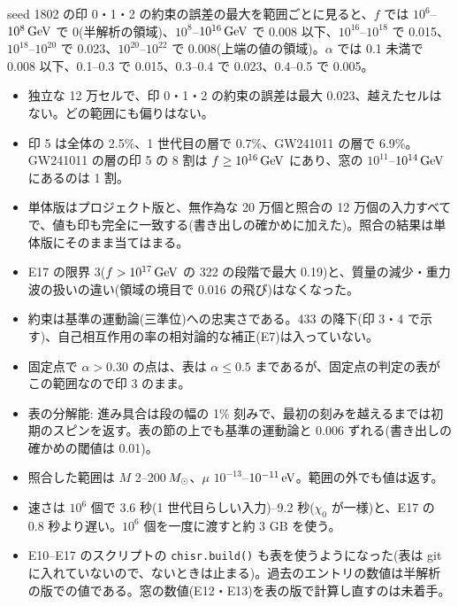 seed 1802 の印 0・1・2 の約束の誤差の最大を範囲ごとに見ると、$f$ では $10^6$--$10^8\,\mathrm{GeV}$ で 0(半解析の領域)、$10^8$--$10^{16}\,\mathrm{GeV}$ で 0.008 以下、$10^{16}$--$10^{18}$ で 0.015、$10^{18}$--$10^{20}$ で 0.023、$10^{20}$--$10^{22}$ で 0.008(上端の値の領域)。$\alpha$ では 0.1 未満で 0.008 以下、0.1--0.3 で 0.015、0.3--0.4 で 0.023、0.4--0.5 で 0.005。

\begin{result}
\begin{itemize}
\item 独立な 12 万セルで、印 0・1・2 の約束の誤差は最大 0.023、越えたセルはない。どの範囲にも偏りはない。
\item 印 5 は全体の 2.5\%、1 世代目の層で 0.7\%、GW241011 の層で 6.9\%。GW241011 の層の印 5 の 8 割は $f\ge10^{16}\,\mathrm{GeV}$ にあり、窓の $10^{11}$--$10^{14}\,\mathrm{GeV}$ にあるのは 1 割。
\item 単体版はプロジェクト版と、無作為な 20 万個と照合の 12 万個の入力すべてで、値も印も完全に一致する(書き出しの確かめに加えた)。照合の結果は単体版にそのまま当てはまる。
\item E17 の限界 3($f>10^{17}\,\mathrm{GeV}$ の 322 の段階で最大 0.19)と、質量の減少・重力波の扱いの違い(領域の境目で 0.016 の飛び)はなくなった。
\end{itemize}
\end{result}

\begin{caveat}
\begin{itemize}
\item 約束は基準の運動論(三準位)への忠実さである。433 の降下(印 3・4 で示す)、自己相互作用の率の相対論的な補正(E7)は入っていない。
\item 固定点で $\alpha>0.30$ の点は、表は $\alpha\le0.5$ まであるが、固定点の判定の表がこの範囲なので印 3 のまま。
\item 表の分解能: 進み具合は段の幅の 1\% 刻みで、最初の刻みを越えるまでは初期のスピンを返す。表の節の上でも基準の運動論と 0.006 ずれる(書き出しの確かめの閾値は 0.01)。
\item 照合した範囲は $M$ 2--200$\,M_\odot$、$\mu$ $10^{-13}$--$10^{-11}\,\mathrm{eV}$。範囲の外でも値は返す。
\item 速さは $10^6$ 個で 3.6 秒(1 世代目らしい入力)--9.2 秒($\chi_0$ が一様)と、E17 の 0.8 秒より遅い。$10^6$ 個を一度に渡すと約 3 GB を使う。
\item E10--E17 のスクリプトの \texttt{chisr.build()} も表を使うようになった(表は git に入れていないので、ないときは止まる)。過去のエントリの数値は半解析の版での値である。窓の数値(E12・E13)を表の版で計算し直すのは未着手。
\end{itemize}
\end{caveat}
